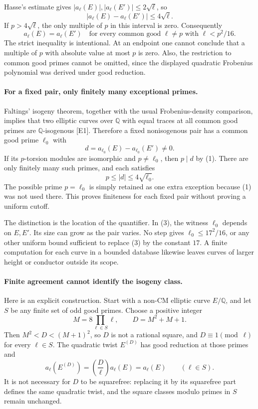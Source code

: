 \documentclass[11pt]{article}
\begin{document}
Hasse's estimate gives $|a_\ell(E)|,|a_\ell(E')|\le2\sqrt\ell$, so
\[
 |a_\ell(E)-a_\ell(E')|\le4\sqrt\ell.
\]
If $p>4\sqrt\ell$, the only multiple of $p$ in this interval is zero. Consequently
\[
 a_\ell(E)=a_\ell(E')\quad
 \text{for every common good }\ell\ne p\text{ with }\ell<p^2/16.
                                                               \tag{2}
\]
The strict inequality is intentional. At an endpoint one cannot conclude that a multiple of $p$ with absolute value at most $p$ is zero. Also, the restriction to common good primes cannot be omitted, since the displayed quadratic Frobenius polynomial was derived under good reduction.

\paragraph{For a fixed pair, only finitely many exceptional primes.}
Faltings' isogeny theorem, together with the usual Frobenius-density comparison, implies that two elliptic curves over $\mathbb Q$ with equal traces at all common good primes are $\mathbb Q$-isogenous [E1]. Therefore a fixed nonisogenous pair has a common good prime $\ell_0$ with
\[
 d=a_{\ell_0}(E)-a_{\ell_0}(E')\ne0.
\]
If its $p$-torsion modules are isomorphic and $p\ne\ell_0$, then $p\mid d$ by (1). There are only finitely many such primes, and each satisfies
\[
 p\le |d|\le4\sqrt{\ell_0}.                               \tag{3}
\]
The possible prime $p=\ell_0$ is simply retained as one extra exception because (1) was not used there. This proves finiteness for each fixed pair without proving a uniform cutoff.

The distinction is the location of the quantifier. In (3), the witness $\ell_0$ depends on $E,E'$. Its size can grow as the pair varies. No step gives $\ell_0\le17^2/16$, or any other uniform bound sufficient to replace (3) by the constant $17$. A finite computation for each curve in a bounded database likewise leaves curves of larger height or conductor outside its scope.

\paragraph{Finite agreement cannot identify the isogeny class.}
Here is an explicit construction. Start with a non-CM elliptic curve $E/\mathbb Q$, and let $S$ be any finite set of odd good primes. Choose a positive integer
\[
 M=8\prod_{\ell\in S}\ell,
 \qquad D=M^2+M+1.
\]
Then $M^2<D<(M+1)^2$, so $D$ is not a rational square, and $D\equiv1\pmod\ell$ for every $\ell\in S$. The quadratic twist $E^{(D)}$ has good reduction at those primes and
\[
 a_\ell(E^{(D)})=\left(\frac D\ell\right)a_\ell(E)
               =a_\ell(E)\qquad(\ell\in S).               \tag{4}
\]
It is not necessary for $D$ to be squarefree: replacing it by its squarefree part defines the same quadratic twist, and the square classes modulo primes in $S$ remain unchanged.
\end{document}
